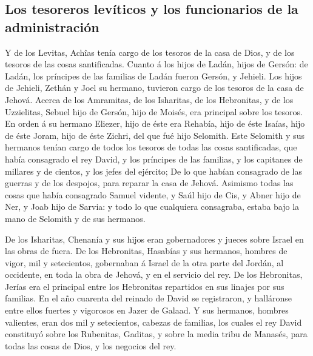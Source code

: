 \hypertarget{los-tesoreros-levuxedticos-y-los-funcionarios-de-la-administraciuxf3n}{%
\subsection{Los tesoreros levíticos y los funcionarios de la
administración}\label{los-tesoreros-levuxedticos-y-los-funcionarios-de-la-administraciuxf3n}}

 Y de los Levitas, Achîas tenía cargo de los tesoros de
la casa de Dios, y de los tesoros de las cosas santificadas.
 Cuanto á los hijos de Ladán, hijos de Gersón: de Ladán,
los príncipes de las familias de Ladán fueron Gersón, y Jehieli.
 Los hijos de Jehieli, Zethán y Joel su hermano, tuvieron
cargo de los tesoros de la casa de Jehová.  Acerca de los
Amramitas, de los Isharitas, de los Hebronitas, y de los Uzzielitas,
 Sebuel hijo de Gersón, hijo de Moisés, era principal
sobre los tesoros.  En orden á su hermano Eliezer, hijo
de éste era Rehabía, hijo de éste Isaías, hijo de éste Joram, hijo de
éste Zichri, del que fué hijo Selomith.  Este Selomith y
sus hermanos tenían cargo de todos los tesoros de todas las cosas
santificadas, que había consagrado el rey David, y los príncipes de las
familias, y los capitanes de millares y de cientos, y los jefes del
ejército;  De lo que habían consagrado de las guerras y
de los despojos, para reparar la casa de Jehová. 
Asimismo todas las cosas que había consagrado Samuel vidente, y Saúl
hijo de Cis, y Abner hijo de Ner, y Joab hijo de Sarvia: y todo lo que
cualquiera consagraba, estaba bajo la mano de Selomith y de sus
hermanos.

 De los Isharitas, Chenanía y sus hijos eran gobernadores
y jueces sobre Israel en las obras de fuera.  De los
Hebronitas, Hasabías y sus hermanos, hombres de vigor, mil y
setecientos, gobernaban á Israel de la otra parte del Jordán, al
occidente, en toda la obra de Jehová, y en el servicio del rey.
 De los Hebronitas, Jerías era el principal entre los
Hebronitas repartidos en sus linajes por sus familias. En el año
cuarenta del reinado de David se registraron, y halláronse entre ellos
fuertes y vigorosos en Jazer de Galaad.  Y sus hermanos,
hombres valientes, eran dos mil y setecientos, cabezas de familias, los
cuales el rey David constituyó sobre los Rubenitas, Gaditas, y sobre la
media tribu de Manasés, para todas las cosas de Dios, y los negocios del
rey.

